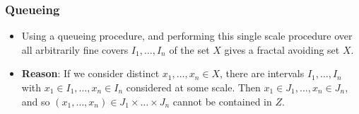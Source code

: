 \documentclass[usenames,dvipsnames]{beamer}
\begin{document}
\begin{frame}
    \frametitle{Queueing}

    \begin{itemize}
        \item Using a queueing procedure, and performing this single scale procedure over all arbitrarily fine covers $I_1, \dots, I_n$ of the set $X$ gives a fractal avoiding set $X$.

        \pause
        \item {\bf Reason}: If we consider distinct $x_1, \dots, x_n \in X$, there are intervals $I_1, \dots, I_n$ with $x_1 \in I_1, \dots, x_n \in I_n$ considered at some scale. Then $x_1 \in J_1, \dots, x_n \in J_n$, and so $(x_1, \dots, x_n) \in J_1 \times \dots \times J_n$ cannot be contained in $Z$.
    \end{itemize}
\end{frame}
\end{document}
